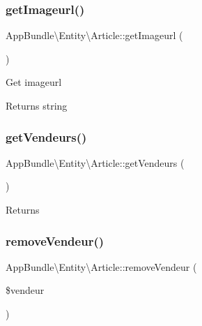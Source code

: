 \subsubsection{\texorpdfstring{get\+Imageurl()}{getImageurl()}}
{\footnotesize\ttfamily App\+Bundle\textbackslash{}\+Entity\textbackslash{}\+Article\+::get\+Imageurl (\begin{DoxyParamCaption}{ }\end{DoxyParamCaption})}

Get imageurl

\begin{DoxyReturn}{Returns}
string 
\end{DoxyReturn}
\mbox{\label{class_app_bundle_1_1_entity_1_1_article_aa0ce076bf9123f1705dc401dd4894585}} 
\subsubsection{\texorpdfstring{get\+Vendeurs()}{getVendeurs()}}
{\footnotesize\ttfamily App\+Bundle\textbackslash{}\+Entity\textbackslash{}\+Article\+::get\+Vendeurs (\begin{DoxyParamCaption}{ }\end{DoxyParamCaption})}

\begin{DoxyReturn}{Returns}

\end{DoxyReturn}
\mbox{\label{class_app_bundle_1_1_entity_1_1_article_a952b84a67d1ae9695569e4d59a6e1bc1}} 
\subsubsection{\texorpdfstring{remove\+Vendeur()}{removeVendeur()}}
{\footnotesize\ttfamily App\+Bundle\textbackslash{}\+Entity\textbackslash{}\+Article\+::remove\+Vendeur (\begin{DoxyParamCaption}\item[{\textbackslash{}\hyperlink{class_app_bundle_1_1_entity_1_1_articlevendeur}{App\+Bundle\textbackslash{}\+Entity\textbackslash{}\+Articlevendeur}}]{\$vendeur }\end{DoxyParamCaption})}

